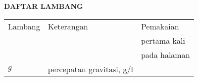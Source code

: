%
%
%

\begin{center}
    \large\bfseries DAFTAR LAMBANG
\end{center}

\vspace{10mm}

\begin{flushleft}
\begin{tabular}{ l  p{10cm}  l}
    \hline
    Lambang              & Keterangan                                   & Pemakaian \\
                                                                        & & pertama kali \\
                                                                        & & pada halaman  \\
                                                                        \hline
    $g$           & percepatan gravitasi, g/l            & \quad \quad \pageref{monod2} \\
    \end{tabular}
\end{flushleft}
